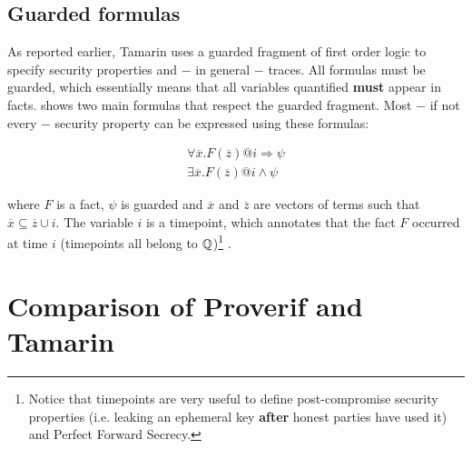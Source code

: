 \subsection{Guarded formulas}
\label{sub:guarded-formulas}

As reported earlier, Tamarin uses a guarded fragment of first order logic to specify security properties and $-$ in general $-$ traces. All formulas must be guarded, which essentially means that all variables quantified \textbf{must} appear in facts.  shows two main formulas that respect the guarded fragment. Most $-$ if not every $-$ security property can be expressed using these formulas:

\begin{equation}
    \label{eq:guarded-formulas}
    \begin{gathered}
        \forall \overline{x}. F\left(\overline{z}\right) @i \Rightarrow \psi \\
        \exists \overline{x}. F\left(\overline{z}\right) @i \land \psi
    \end{gathered}
\end{equation}

where $F$ is a fact, $\psi$ is guarded and $\overline{x}$ and $\overline{z}$ are vectors of terms such that $\overline{x} \subseteq \overline{z} \cup i$.
The variable $i$ is a timepoint, which annotates that the fact $F$ occurred at time $i$ (timepoints all belong to $\mathbb{Q}$)\footnote{Notice that timepoints are very useful to define post-compromise security properties (i.e. leaking an ephemeral key \textbf{after} honest parties have used it) and Perfect Forward Secrecy.} \cite{TamarinTeachingSlides}.

\section{Comparison of Proverif and Tamarin}
\label{section:proverif-vs-tamarin}

